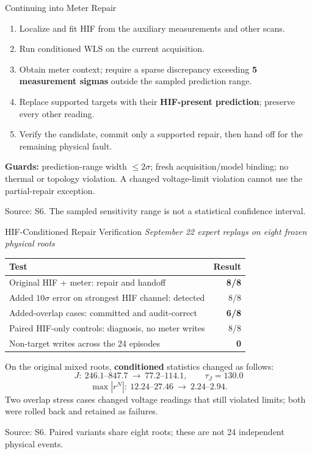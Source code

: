 \documentclass{beamer}
\newcommand{\src}[1]{\par\vfill\begin{minipage}{0.67\textwidth}\tiny\color{gray}Source: #1.\end{minipage}\par}
\newcommand{\scope}[1]{{\small\textit{#1}}\par\vspace{0.5em}}
\begin{document}
\begin{frame}{Continuing into Meter Repair}
  \begin{enumerate}
    \setlength\itemsep{0.35em}
    \item Localize and fit HIF from the auxiliary measurements and other scans.
    \item Run conditioned WLS on the current acquisition.
    \item Obtain meter context; require a sparse discrepancy exceeding \textbf{5 measurement sigmas} outside the sampled prediction range.
    \item Replace supported targets with their \textbf{HIF-present prediction}; preserve every other reading.
    \item Verify the candidate, commit only a supported repair, then hand off for the remaining physical fault.
  \end{enumerate}
  \vspace{0.6em}
  \small
  \textbf{Guards:} prediction-range width $\leq2\sigma$; fresh acquisition/model binding; no thermal or topology violation. A changed voltage-limit violation cannot use the partial-repair exception.
  \src{S6. The sampled sensitivity range is not a statistical confidence interval}
\end{frame}

\begin{frame}{HIF-Conditioned Repair Verification}
  \scope{September 22 expert replays on eight frozen physical roots}
  \small
  \begin{center}
    \renewcommand{\arraystretch}{1.25}
    \begin{tabularx}{\textwidth}{Xr}
      \toprule
      Test & Result \\
      \midrule
      Original HIF + meter: repair and handoff & \textbf{8/8} \\
      Added $10\sigma$ error on strongest HIF channel: detected & 8/8 \\
      Added-overlap cases: committed and audit-correct & \textbf{6/8} \\
      Paired HIF-only controls: diagnosis, no meter writes & 8/8 \\
      Non-target writes across the 24 episodes & \textbf{0} \\
      \bottomrule
    \end{tabularx}
  \end{center}
  On the original mixed roots, \textbf{conditioned} statistics changed as follows:
  \[J:\ 246.1\text{--}847.7\ \longrightarrow\ 77.2\text{--}114.1,\qquad \tau_J=130.0\]
  \[\max|r^N|:\ 12.24\text{--}27.46\ \longrightarrow\ 2.24\text{--}2.94.\]
  \small Two overlap stress cases changed voltage readings that still violated limits; both were rolled back and retained as failures.
  \src{S6. Paired variants share eight roots; these are not 24 independent physical events}
\end{frame}
\end{document}
